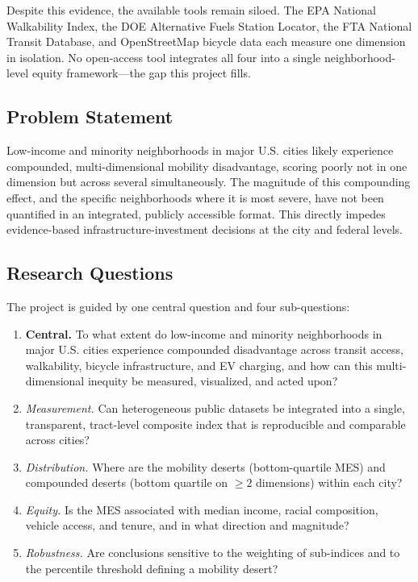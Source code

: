 \documentclass[11pt]{article}
\begin{document}
Despite this evidence, the available tools remain siloed. The EPA National
Walkability Index, the DOE Alternative Fuels Station Locator, the FTA National
Transit Database, and OpenStreetMap bicycle data each measure one dimension in
isolation. No open-access tool integrates all four into a single
neighborhood-level equity framework---the gap this project fills.

\subsection{Problem Statement}
\begin{sloppypar}
Low-income and minority neighborhoods in major U.S. cities likely experience
compounded, multi-dimensional mobility disadvantage, scoring poorly not in one
dimension but across several simultaneously. The magnitude of this compounding
effect, and the specific neighborhoods where it is most severe, have not been
quantified in an integrated, publicly accessible format. This directly impedes
evidence-based infrastructure-investment decisions at the city and federal levels.
\end{sloppypar}

\subsection{Research Questions}
The project is guided by one central question and four sub-questions:
\begin{enumerate}[leftmargin=1.4em,itemsep=1pt]
\item \textbf{Central.} To what extent do low-income and minority neighborhoods
in major U.S. cities experience compounded disadvantage across transit access,
walkability, bicycle infrastructure, and EV charging, and how can this
multi-dimensional inequity be measured, visualized, and acted upon?
\item \textit{Measurement.} Can heterogeneous public datasets be integrated into
a single, transparent, tract-level composite index that is reproducible and
comparable across cities?
\item \textit{Distribution.} Where are the mobility deserts (bottom-quartile MES)
and compounded deserts (bottom quartile on $\geq 2$ dimensions) within each city?
\item \textit{Equity.} Is the MES associated with median income, racial
composition, vehicle access, and tenure, and in what direction and magnitude?
\item \textit{Robustness.} Are conclusions sensitive to the weighting of
sub-indices and to the percentile threshold defining a mobility desert?
\end{enumerate}
\end{document}
